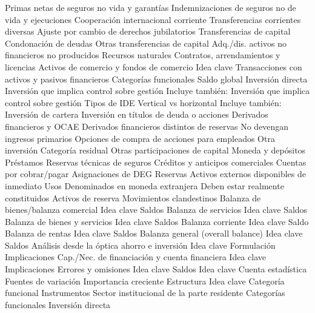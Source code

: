 \documentclass{nuevotema}
\begin{document}
\begin{esquema}[enumerate]
			\3 Primas netas de seguros no vida y garantías
			\3 Indemnizaciones de seguros no de vida y ejecuciones
			\3 Cooperación internacional corriente
			\3 Transferencias corrientes diversas
			\3 Ajuste por cambio de derechos jubilatorios
	\1 
		\2 Transferencias de capital
			\3 Condonación de deudas
			\3 Otras transferencias de capital
		\2 Adq./dis. activos no financieros no producidos
			\3 Recursos naturales
			\3 Contratos, arrendamientos y licencias
			\3 Activos de comercio y fondos de comercio
	\1 
		\2 Idea clave
			\3 Transacciones con activos y pasivos financieros
			\3 Categorías funcionales
			\3 Saldo global
		\2 Inversión directa
			\3 Inversión que implica control sobre gestión
			\3 Incluye también:
			\3 Inversión que implica control sobre gestión
			\3 Tipos de IDE
			\3 Vertical vs horizontal
			\3 Incluye también:
		\2 Inversión de cartera
			\3 Inversión en títulos de deuda o acciones
		\2 Derivados financieros y OCAE
			\3 Derivados financieros distintos de reservas
			\3 No devengan ingresos primarios
			\3 Opciones de compra de acciones para empleados
		\2 Otra inversión
			\3 Categoría residual
			\3 Otras participaciones de capital
			\3 Moneda y depósitos
			\3 Préstamos
			\3 Reservas técnicas de seguros
			\3 Créditos y anticipos comerciales
			\3 Cuentas por cobrar/pagar
			\3 Asignaciones de DEG
		\2 Reservas
			\3 Activos externos disponibles de inmediato
			\3 Usos
			\3 Denominados en moneda extranjera
			\3 Deben estar realmente constituidos
			\3 Activos de reserva
		\2 Movimientos clandestinos
	\1 
		\2 Balanza de bienes/balanza comercial
			\3 Idea clave
			\3 Saldos
		\2 Balanza de servicios
			\3 Idea clave
			\3 Saldos
		\2 Balanza de bienes y servicios
			\3 Idea clave
			\3 Saldos
		\2 Balanza corriente
			\3 Idea clave
			\3 Saldo
		\2 Balanza de rentas
			\3 Idea clave
			\3 Saldos
		\2 Balanza general (overall balance)
			\3 Idea clave
			\3 Saldos
		\2 Análisis desde la óptica ahorro e inversión
			\3 Idea clave
			\3 Formulación
			\3 Implicaciones
		\2 Cap./Nec. de financiación y cuenta financiera
			\3 Idea clave
			\3 Implicaciones
		\2 Errores y omisiones
			\3 Idea clave
			\3 Saldos
	\1 \marcar{Posición de inversión internacional}
		\2 Idea clave
			\3 Cuenta estadística
			\3 Fuentes de variación
			\3 Importancia creciente
		\2 Estructura
			\3 Idea clave
			\3 Categoría funcional
			\3 Instrumentos
			\3 Sector institucional de la parte residente
		\2 Categorías funcionales
			\3 Inversión directa

\end{esquema}
\end{document}
